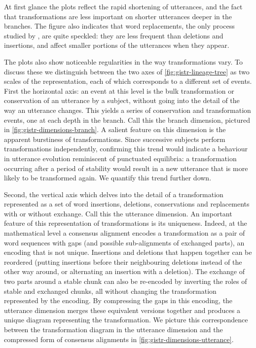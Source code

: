 \documentclass[a4paper,fleqn]{cas-dc}
\begin{document}
At first glance the plots reflect the rapid shortening of utterances,
and the fact that transformations are less important on shorter
utterances deeper in the branches. The figure also indicates that word
replacements, the only process studied by \citet{lerique-2018-semantic-drift},
are quite speckled: they are less frequent than deletions and
insertions, and affect smaller portions of the utterances when they
appear.

The plots also show noticeable regularities in the way transformations
vary. To discuss these we distinguish between the two axes of
\cref{fig:gistr-lineage-tree} as two scales of the representation, each
of which corresponds to a different set of events. First the horizontal
axis: an event at this level is the bulk transformation or conservation
of an utterance by a subject, without going into the detail of the way
an utterance changes. This yields a series of conservation and
transformation events, one at each depth in the branch. Call this the
branch dimension, pictured in \cref{fig:gistr-dimensions-branch}. A
salient feature on this dimension is the apparent burstiness of
transformations. Since successive subjects perform transformations
independently, confirming this trend would indicate a behaviour in
utterance evolution reminiscent of punctuated equilibria: a
transformation occurring after a period of stability would result in a
new utterance that is more likely to be transformed again. We quantify
this trend further down.

Second, the vertical axis which delves into the detail of a
transformation represented as a set of word insertions, deletions,
conservations and replacements with or without exchange. Call this the
utterance dimension. An important feature of this representation of
transformations is its uniqueness. Indeed, at the mathematical level a
consensus alignment encodes a transformation as a pair of word sequences
with gaps (and possible sub-alignments of exchanged parts), an encoding
that is not unique. Insertions and deletions that happen together can be
reordered (putting insertions before their neighbouring deletions
instead of the other way around, or alternating an insertion with a
deletion). The exchange of two parts around a stable chunk can also be
re-encoded by inverting the roles of stable and exchanged chunks, all
without changing the transformation represented by the encoding. By
compressing the gaps in this encoding, the utterance dimension merges
these equivalent versions together and produces a unique diagram
representing the transformation. We picture this correspondence between
the transformation diagram in the utterance dimension and the compressed
form of consensus alignments in \cref{fig:gistr-dimensions-utterance}.
\end{document}
